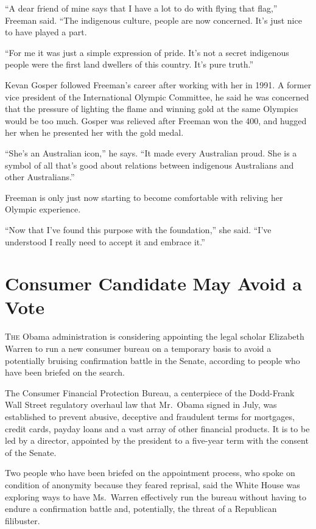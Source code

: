﻿\documentclass[12pt]{article}
\begin{document}
``A dear friend of mine says that I have a lot to do with flying that flag,'' Freeman said. ``The
indigenous culture, people are now concerned. It's just nice to have played a part.

``For me it was just a simple expression of pride. It's not a secret indigenous people were the
first land dwellers of this country. It's pure truth.''

Kevan Gosper followed Freeman's career after working with her in 1991. A former vice president of
the International Olympic Committee, he said he was concerned that the pressure of lighting the
flame and winning gold at the same Olympics would be too much. Gosper was relieved after Freeman won
the 400, and hugged her when he presented her with the gold medal.

``She's an Australian icon,'' he says. ``It made every Australian proud. She is a symbol of all
that's good about relations between indigenous Australians and other Australians.''

Freeman is only just now starting to become comfortable with reliving her Olympic experience.

``Now that I've found this purpose with the foundation,'' she said. ``I've understood I really need
to accept it and embrace it.''

\pagebreak
\section{Consumer Candidate May Avoid a Vote}

\lettrine{T}{he} Obama administration is considering appointing the legal
scholar Elizabeth Warren to run a new consumer bureau on a temporary basis to avoid a potentially
bruising confirmation battle in the Senate, according to people who have been briefed on the search.

The Consumer Financial Protection Bureau, a centerpiece of the Dodd-Frank Wall Street regulatory
overhaul law that Mr.~Obama signed in July, was established to prevent abusive, deceptive and
fraudulent terms for mortgages, credit cards, payday loans and a vast array of other financial
products. It is to be led by a director, appointed by the president to a five-year term with the
consent of the Senate.

Two people who have been briefed on the appointment process, who spoke on condition of anonymity
because they feared reprisal, said the White House was exploring ways to have Ms.~Warren effectively
run the bureau without having to endure a confirmation battle and, potentially, the threat of a
Republican filibuster.
\end{document}
